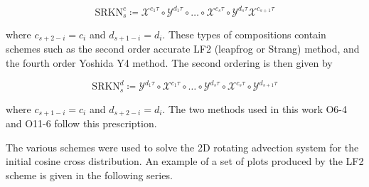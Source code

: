 \documentclass[11pt,titlepage]{report}
\begin{document}
\begin{equation}\text{SRKN}_s^c \coloneqq \mathcal{X}^{c_1\tau}\circ\mathcal{Y}^{d_1\tau}\circ \ldots \circ \mathcal{X}^{c_s\tau}\circ\mathcal{Y}^{d_s\tau}\mathcal{X}^{c_{s+1}\tau} \label{eq:SRKN_sc}
\end{equation}

\noindent where $c_{s+2-i} = c_i$ and $d_{s+1-i} = d_i$. These types of compositions contain schemes such as the second order accurate LF2 (leapfrog or Strang) method, and the fourth order Yoshida Y4 method. The second ordering is then given by

\begin{equation}\text{SRKN}_s^d \coloneqq \mathcal{Y}^{d_1\tau}\circ\mathcal{X}^{c_1\tau} \circ \ldots \circ \mathcal{Y}^{d_s\tau}\circ\mathcal{X}^{c_s\tau}\circ\mathcal{Y}^{d_{s+1}\tau} \label{eq:SRKN_sd}
\end{equation}

\noindent where $c_{s+1-i} = c_i$ and $d_{s+2-i} = d_i$. The two methods used in this work O6-4 and O11-6 follow this prescription.

\newpage





The various schemes were used to solve the 2D rotating advection system for the initial cosine cross distribution. An example of a set of plots produced by the LF2 scheme is given in the following series.
\end{document}
